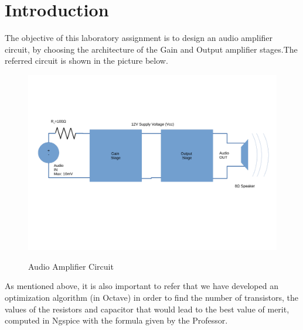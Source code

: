 \newpage
\section{Introduction}
\label{sec:introduction}

The objective of this laboratory assignment is to design an audio amplifier circuit, by choosing the architecture of the Gain and Output amplifier stages.The referred circuit is shown in the picture below. 

\bigskip 

\begin{figure}[!ht] \centering

\caption{Audio Amplifier Circuit}
\squeezeup
\squeezeup



\includegraphics[width=1\textwidth, scale=1.0]{DesenhoT4.pdf}  
\squeezeup
\squeezeup
\squeezeup
\squeezeup
\squeezeup
\squeezeup
\label{fig:circuit}
\end{figure}

As mentioned above, it is also important to refer that we have developed an optimization algorithm (in Octave) in order to find the number of transistors, the values of the resistors and capacitor that would lead to the best value of merit, computed in Ngspice with the formula given by the Professor.   

